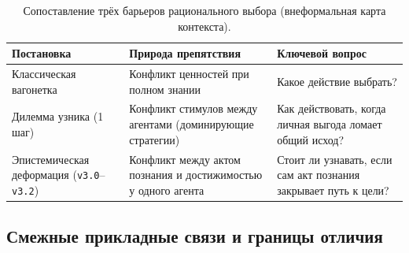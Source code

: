 \documentclass[10pt,a4paper]{article}
\theoremstyle{cleanthm}
\theoremstyle{cleandef}
\begin{document}
\begin{table}[!htbp]
\centering
\caption{Сопоставление трёх барьеров рационального выбора (внеформальная карта контекста).}
\label{tab:trolley_pd_edr}
\small
\begin{tabularx}{\linewidth}{@{}>{\raggedright\arraybackslash}p{38mm} >{\raggedright\arraybackslash}X >{\raggedright\arraybackslash}X@{}}
\toprule
\textbf{Постановка} & \textbf{Природа препятствия} & \textbf{Ключевой вопрос} \\
\midrule
Классическая вагонетка & Конфликт ценностей при полном знании & Какое действие выбрать? \\
Дилемма узника (1 шаг) & Конфликт стимулов между агентами (доминирующие стратегии) & Как действовать, когда личная выгода ломает общий исход? \\
Эпистемическая деформация (\texttt{v3.0}--\texttt{v3.2}) & Конфликт между актом познания и достижимостью у одного агента & Стоит ли узнавать, если сам акт познания закрывает путь к цели? \\
\bottomrule
\end{tabularx}
\end{table}

\subsection{Смежные прикладные связи и границы отличия}
\end{document}
